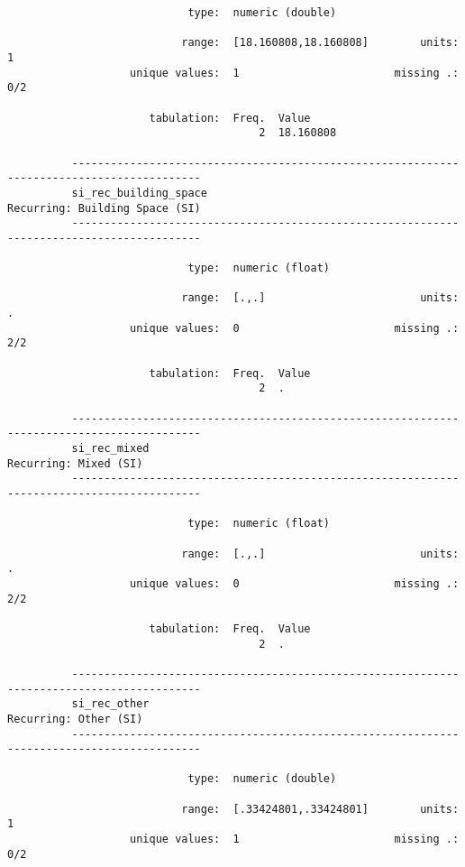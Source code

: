 \documentclass{article}
\begin{document}
\begin{verbatim}
                            type:  numeric (double)
          
                           range:  [18.160808,18.160808]        units:  1
                   unique values:  1                        missing .:  0/2
          
                      tabulation:  Freq.  Value
                                       2  18.160808
          
          ------------------------------------------------------------------------------------------
          si_rec_building_space                                       Recurring: Building Space (SI)
          ------------------------------------------------------------------------------------------
          
                            type:  numeric (float)
          
                           range:  [.,.]                        units:  .
                   unique values:  0                        missing .:  2/2
          
                      tabulation:  Freq.  Value
                                       2  .
          
          ------------------------------------------------------------------------------------------
          si_rec_mixed                                                         Recurring: Mixed (SI)
          ------------------------------------------------------------------------------------------
          
                            type:  numeric (float)
          
                           range:  [.,.]                        units:  .
                   unique values:  0                        missing .:  2/2
          
                      tabulation:  Freq.  Value
                                       2  .
          
          ------------------------------------------------------------------------------------------
          si_rec_other                                                         Recurring: Other (SI)
          ------------------------------------------------------------------------------------------
          
                            type:  numeric (double)
          
                           range:  [.33424801,.33424801]        units:  1
                   unique values:  1                        missing .:  0/2
          

\end{verbatim}
\end{document}
